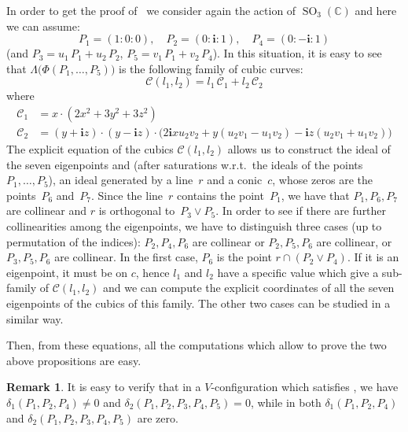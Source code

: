 \documentclass{amsart}
\theoremstyle{plain}
\theoremstyle{definition}
\newtheorem{rmk}[lemma]{Remark}
\newcommand{\C}{\mathbb{C}}
\newcommand{\SO}{\operatorname{SO}}
\newcommand{\iii}{\textbf{i}}
\begin{document}
In order to get the proof of~
we consider again the action of $\SO_3(\C)$ and here we can assume:
%
\[
  P_1 = (1: 0: 0), \quad
  P_2 = (0: \iii: 1), \quad
  P_4 = (0: -\iii: 1)
\]
%
(and $P_3 = u_1 \, P_1 + u_2 \, P_2$, $P_5 = v_1 \, P_1 + v_2 \, P_4$). 
In this situation, it
is easy to see that $\Lambda\bigl(\Phi(P_1, \dots, P_5)\bigr)$
is the following family of cubic curves:
%
\[
  \mathcal{C}(l_1, l_2) = l_1 \, \mathcal{C}_1 + l_2 \, \mathcal{C}_2
\]
%
where
%
\begin{align*}
  \mathcal{C}_1 & = x \cdot \left(2x^{2} + 3 y^{2} + 3 z^{2}\right)\\
  \mathcal{C}_2 & = (y + \iii z) \cdot (y - \iii z)
  \cdot \bigl(2 \iii x u_{2} v_{2} + y (u_{2} v_{1}- u_{1} v_{2})
  - \iii z (u_{2} v_{1} + u_{1} v_{2})\bigr)
\end{align*}
%
The explicit equation of the cubics $\mathcal{C}(l_1, l_2)$ allows us to
construct the ideal of the seven eigenpoints and (after
saturations w.r.t.\ the ideals of the points $P_1, \dotsc, P_5$),
an ideal generated by a line~$r$ and a conic~$c$, whose zeros are
the points~$P_6$ and~$P_7$. Since the line~$r$ contains the point~$P_1$,
we have that $P_1, P_6, P_7$ are collinear and $r$ is orthogonal to~$P_3 \vee P_5$.
In order to see if there are further collinearities among the
eigenpoints, we have to distinguish three cases (up to permutation
of the indices): $P_2, P_4, P_6$ are collinear or $P_2, P_5, P_6$ are
collinear, or $P_3, P_5, P_6$ are collinear. In the first case, $P_6$
is the point $r \cap (P_2\vee P_4)$. If it is an eigenpoint, it must be
on $c$, hence $l_1$ and $l_2$ have a specific value which give a sub-family
of $\mathcal{C}(l_1, l_2)$ and we can compute the explicit coordinates of
all the seven eigenpoints of the cubics of this family. The other two
cases can be studied in a similar way.

Then, from these equations, all the computations which allow to prove
the two above propositions are easy.
%
\begin{rmk}
\label{rmk:delta1_and_delta2}
It is easy to verify that in
a $V$-configuration which satisfies , we have
$\delta_1(P_1, P_2, P_4)\neq 0$ and
$\delta_2(P_1, P_2, P_3, P_4, P_5) = 0$,
while in  both $\delta_1(P_1, P_2, P_4)$ and
$\delta_2(P_1, P_2, P_3, P_4, P_5)$ are zero.
\end{rmk}
\end{document}
